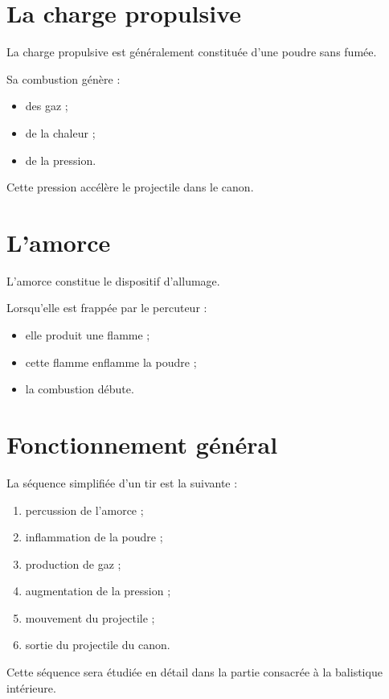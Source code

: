 \section{La charge propulsive}

La charge propulsive est généralement constituée d'une poudre sans fumée.

Sa combustion génère :

\begin{itemize}
    \item des gaz ;
    \item de la chaleur ;
    \item de la pression.
\end{itemize}

Cette pression accélère le projectile dans le canon.

\section{L'amorce}

L'amorce constitue le dispositif d'allumage.

Lorsqu'elle est frappée par le percuteur :

\begin{itemize}
    \item elle produit une flamme ;
    \item cette flamme enflamme la poudre ;
    \item la combustion débute.
\end{itemize}

\section{Fonctionnement général}

La séquence simplifiée d'un tir est la suivante :

\begin{enumerate}
    \item percussion de l'amorce ;
    \item inflammation de la poudre ;
    \item production de gaz ;
    \item augmentation de la pression ;
    \item mouvement du projectile ;
    \item sortie du projectile du canon.
\end{enumerate}

Cette séquence sera étudiée en détail dans la partie consacrée à la
balistique intérieure.

